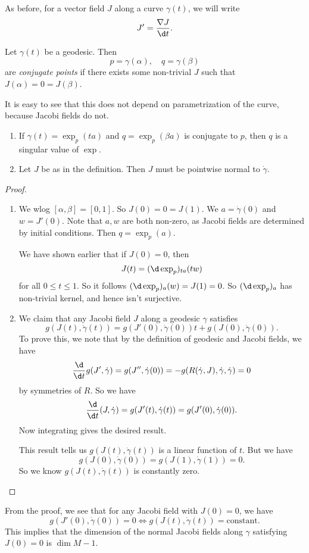 \documentclass[a4paper]{article}
\begin{document}
As before, for a vector field $J$ along a curve $\gamma(t)$, we will write
\[
  J' = \frac{\nabla J}{\d t}.
\]
\begin{defi}
  Let $\gamma(t)$ be a geodesic. Then
  \[
    p = \gamma(\alpha), \quad q = \gamma(\beta)
  \]
  are \emph{conjugate points} if there exists some non-trivial $J$ such that $J(\alpha) = 0 = J(\beta)$.
\end{defi}
It is easy to see that this does not depend on parametrization of the curve, because Jacobi fields do not.

\begin{prop}\leavevmode
  \begin{enumerate}
    \item If $\gamma(t) = \exp_p(t a)$ and $q = \exp_p(\beta a)$ is conjugate to $p$, then $q$ is a singular value of $\exp$.
    \item Let $J$ be as in the definition. Then $J$ must be pointwise normal to $\dot{\gamma}$.
  \end{enumerate}
\end{prop}

\begin{proof}\leavevmode
  \begin{enumerate}
    \item We wlog $[\alpha, \beta] = [0, 1]$. So $J(0) = 0 = J(1)$. We $a = \dot{\gamma}(0)$ and $w = J'(0)$. Note that $a, w$ are both non-zero, as Jacobi fields are determined by initial conditions. Then $q = \exp_p(a)$.

      We have shown earlier that if $J(0) = 0$, then
      \[
        J(t) = (\d \exp_p)_{ta} (tw)
      \]
      for all $0 \leq t \leq 1$. So it follows $(\d \exp_p)_{a}(w) = J(1) = 0$. So $(\d \exp_p)_a$ has non-trivial kernel, and hence isn't surjective.
    \item We claim that any Jacobi field $J$ along a geodesic $\gamma$ satisfies
        \[
          g(J(t), \dot{\gamma}(t)) = g(J'(0), \dot{\gamma}(0)) t + g(J(0), \dot{\gamma}(0)).
        \]
      To prove this, we note that by the definition of geodesic and Jacobi fields, we have
      \[
        \frac{\d}{\d t} g(J', \dot{\gamma}) = g(J'', \dot{\gamma}(0)) = -g(R(\dot{\gamma}, J), \dot{\gamma}, \dot{\gamma}) = 0
      \]
      by symmetries of $R$. So we have
      \[
        \frac{\d}{\d t}(J, \dot{\gamma}) = g(J'(t), \dot{\gamma}(t)) = g(J'(0), \dot{\gamma}(0)).
      \]
      Now integrating gives the desired result.

     This result tells us $g(J(t), \dot{\gamma}(t))$ is a linear function of $t$. But we have
      \[
        g(J(0), \dot{\gamma}(0)) = g(J(1), \dot{\gamma}(1)) = 0.
      \]
      So we know $g(J(t), \dot{\gamma}(t))$ is constantly zero.
  \end{enumerate}
\end{proof}
From the proof, we see that for any Jacobi field with $J(0) = 0$, we have
\[
  g(J'(0), \dot{\gamma}(0)) = 0 \Longleftrightarrow g(J(t), \dot{\gamma}(t)) = \text{constant}.
\]
This implies that the dimension of the normal Jacobi fields along $\gamma$ satisfying $J(0) = 0$ is $\dim M - 1$.
\end{document}
